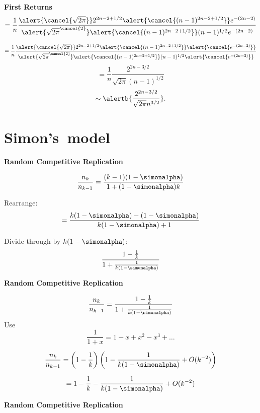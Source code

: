 {{\begin{frame}[t]
{\begin{frame}[t]
  \textbf{First Returns}
  {$$
    =
    \frac{1}{n}
    \frac{
      \alert{\cancel{\sqrt{2\pi}}}2^{2n-2+1/2} \alert{\cancel{(n-1)^{2n-2+1/2}}} e^{-(2n-2)}
    }
    {
      \alert{\sqrt{2\pi}^{\cancel{2}}} \alert{\cancel{(n-1)^{2n-2+1/2}}} (n-1)^{1/2} e^{-(2n-2)}
    }
    $$}

  {$$
    =
    \frac{1}{n}
    \frac{
      \alert{\cancel{\sqrt{2\pi}}}2^{2n-2+1/2} \alert{\cancel{(n-1)^{2n-2+1/2}}} \alert{\cancel{e^{-(2n-2)}}}
    }
    {
      \alert{\sqrt{2\pi}^{\cancel{2}}} \alert{\cancel{(n-1)^{2n-2+1/2}}} (n-1)^{1/2} \alert{\cancel{e^{-(2n-2)}}}
    }
    $$}
  {$$
    =
    \frac{1}{n}
    \frac{
      2^{2n-3/2} 
    }
    {
      \sqrt{2\pi} (n-1)^{1/2}
    }
    $$}
  {$$
    \sim 
    \alertb{
      \frac{
        2^{2n-3/2}
      }
      {
        \sqrt{2 \pi} n^{3/2}
      }
    }.
    $$}


\section{Simon's\ model}

  \textbf{Random Competitive Replication}

  
   
    $$  \frac{n_k}{n_{k-1}}
    =
    \frac{(k-1)(1-\simonalpha)}
    {1+(1-\simonalpha)k}
    $$ 
   
    Rearrange:
    $$
    = \frac{k(1-\simonalpha) - (1-\simonalpha)}
    {k(1-\simonalpha) + 1}
    $$
   
    Divide through by $k(1-\simonalpha)$:
    $$
    {\frac{1 - \frac{1}{k}}
    {{ 1 + \frac{1}{k(1-\simonalpha)}}}
    }
    $$

  
  

  \textbf{Random Competitive Replication}

  
    
    $$
    \frac{n_k}{n_{k-1}} =
    \frac{1 - \frac{1}{k}}
    { 1 + \frac{1}{k(1-\simonalpha)}}
    $$
   Use 
    $$ \frac{1}{1+x} = 1 - x + x^2 -x^3 + \ldots $$
  
    $$
    \frac{n_k}{n_{k-1}} =
    \left(
      1 - \frac{1}{k}
    \right)
    \left(
      1 - \frac{1}{k(1-\simonalpha)} + O(k^{-2})
    \right)
    $$
  
    $$
    =
    1 - \frac{1}{k}
    - \frac{1}{k(1-\simonalpha)} + O(k^{-2})
    $$
  


  \textbf{Random Competitive Replication}
  

\end{frame}}
\end{frame}}}
